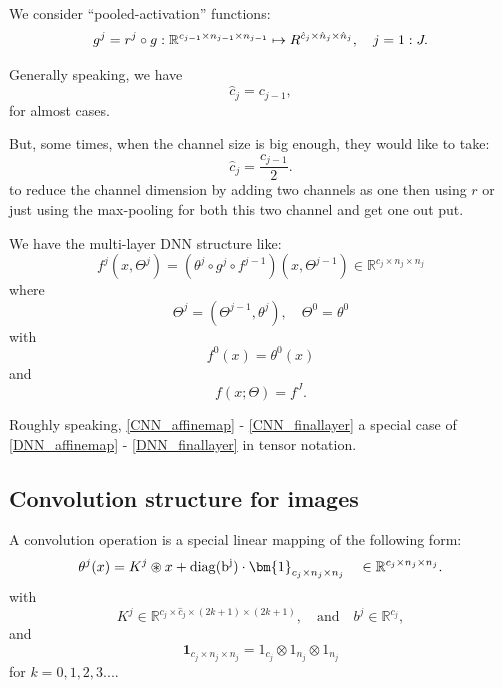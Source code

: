 We consider ``pooled-activation'' functions:
\begin{equation}\label{CNN_iteration_vector}
g^j=r^j\circ g:  \mathbb R^{c_{j-1} \times n_{j-1} \times n_{j-1} }\mapsto
\mathbb  \mathbb R^{\hat c_j \times \hat n_{j} \times \hat n_j }, \quad j  = 1:J. 
\end{equation}
\begin{remark}
	Generally speaking, we have 
	\begin{equation}
	\hat c_{j} = c_{j-1},
	\end{equation}
	for almost cases.
	
	But, some times, when the channel size is big enough,  they would like to take:
	\begin{equation}
	\hat c_{j} = \frac{c_{j-1}}{2}.
	\end{equation}
	to reduce the channel dimension by adding two channels as one then using $r$ or just using the max-pooling for both this two channel and get one out put.
	
\end{remark}


We have the multi-layer DNN structure like:
\begin{equation}\label{CNN_iteration_vector}
f^j(x,\Theta^j) = (\theta^j\circ g^{j}\circ f^{j-1})(x,\Theta^{j-1}) \in \mathbb{R}^{c_j \times n_j \times n_j }
\end{equation}
where
\begin{equation}
\Theta^j=(\Theta^{j-1},\theta^j), \quad \Theta^0=\theta^0 
\end{equation}
with 
\begin{equation}
f^0(x)=\theta^0(x)
\end{equation}
and 
\begin{equation}\label{CNN_finallayer}
f(x; \Theta) = f^J.
\end{equation}

Roughly speaking, \eqref{CNN_affinemap} -
\eqref{CNN_finallayer} a special case of \eqref{DNN_affinemap}
- \eqref{DNN_finallayer} in tensor notation.


\subsection{Convolution structure for images}
A convolution operation is a special linear mapping of the following form:
\begin{equation}
\theta^j(x) = K^j \circledast x + {\rm{diag}(b^j)} \cdot \bm{1}_{c_j \times n_j \times n_j} \quad
\in\mathbb R^{c_j\times n_j\times n_j}.
\end{equation}
with 
\begin{equation}
K^j \in \mathbb{R}^{ c_{j} \times \hat c_{j} \times (2k+1) \times (2k+1)},  \quad \text{and} \quad b^j \in \mathbb{R}^{c_j},
\end{equation}
and 
\begin{equation}
\bm{1}_{c_j \times n_j \times n_j} = 1_{c_{j}} \otimes 1_{n_j} \otimes 1_{n_j}
\end{equation}
for $k = 0, 1, 2, 3...$.

